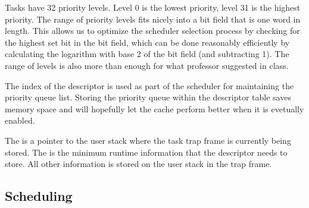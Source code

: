 \documentclass[pdftex,10pt,a4paper]{article}
\begin{document}
Tasks have 32 priority levels. Level 0 is the lowest priority, level
31 is the highest priority. The range of priority levels fits nicely
into a bit field that is one word in length. This allows us to
optimize the scheduler selection process by checking for the highest
set bit in the bit field, which can be done reasonably efficiently by
calculating the logarithm with base 2 of the bit field (and
subtracting 1). The range of levels is also more than enough for what
professor suggested in class.

The  index of the descriptor is used as part of the
scheduler for maintaining the priority queue list. Storing the
priority queue within the descriptor table saves memory space
and will hopefully let the cache perform better when it is evetually
enabled.

The  is a pointer to the user stack where the task trap frame
is currently being stored. The  is the minimum runtime
information that the descriptor needs to store. All other information
is stored on the user stack in the trap frame.

\subsection*{Scheduling}
\end{document}

